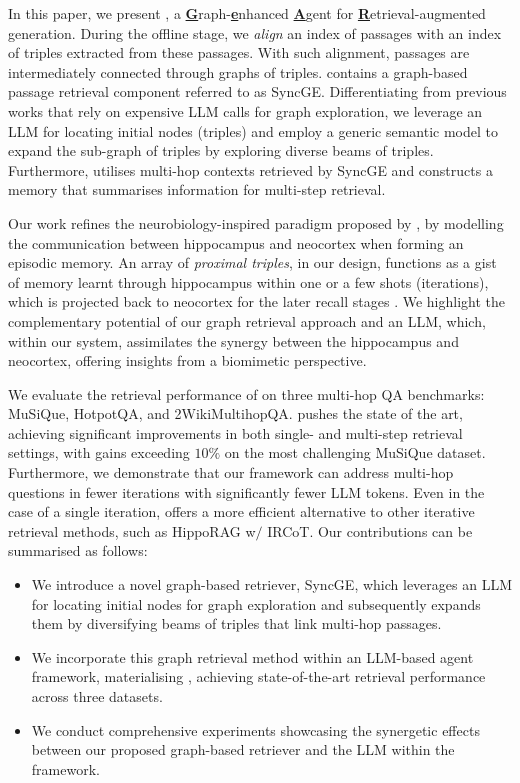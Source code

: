 In this paper, we present \gear, a \underline{\textbf{G}}raph-\underline{\textbf{e}}nhanced \underline{\textbf{A}}gent for \underline{\textbf{R}}etrieval-augmented generation. During the offline stage, we \textit{align} an index of passages with an index of triples extracted from these passages. With such alignment, passages are intermediately connected through graphs of triples. \gear contains a graph-based passage retrieval component referred to as SyncGE. Differentiating from previous works that rely on expensive LLM calls for graph exploration, we leverage an LLM for locating initial nodes (triples) and employ a generic semantic model to expand the sub-graph of triples by exploring diverse beams of triples. Furthermore, \gear utilises multi-hop contexts retrieved by SyncGE and constructs a memory that summarises information for multi-step retrieval. 


Our work refines the neurobiology-inspired paradigm proposed by \citeauthor{Gutierrez2024}, by modelling the communication between hippocampus and neocortex when forming an episodic memory. An array of \textit{proximal triples}, in our design, functions as a gist of memory learnt through hippocampus within one or a few shots (iterations), which is projected back to neocortex for the later recall stages \cite{Hanslmayr2016,Griffiths2019}. We highlight the complementary potential of our graph retrieval approach and an LLM, which, within our system, assimilates the synergy between the hippocampus and neocortex, offering insights from a biomimetic perspective.


We evaluate the retrieval performance of \gear on three multi-hop QA benchmarks: MuSiQue, HotpotQA, and 2WikiMultihopQA. \gear pushes the state of the art, achieving significant improvements in both single- and multi-step retrieval settings, with gains exceeding $10\%$ on the most challenging MuSiQue dataset. Furthermore, we demonstrate that our framework can address multi-hop questions in fewer iterations with significantly fewer LLM tokens. Even in the case of a single iteration, \gear offers a more efficient alternative to other iterative retrieval methods, such as HippoRAG w$/$ IRCoT. Our contributions can be summarised as follows:
\begin{itemize}
\item We introduce a novel graph-based retriever, SyncGE, which leverages an LLM for locating initial nodes for graph exploration and subsequently expands them by diversifying beams of triples that link multi-hop passages.
\item We incorporate this graph retrieval method within an LLM-based agent framework, materialising \gear, achieving state-of-the-art retrieval performance across three datasets.
\item We conduct comprehensive experiments showcasing the synergetic effects between our proposed graph-based retriever and the LLM within the \gear framework.
\end{itemize}

